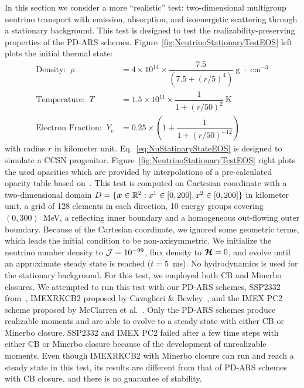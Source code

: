 In this section we consider a more ``realistic'' test: two-dimensional multigroup neutrino transport with emission, absorption, and isoenergetic scattering through a stationary background.  
This test is designed to test the realizability-preserving properties of the PD-ARS schemes.  
Figure~\ref{fig:NeutrinoStationaryTestEOS} left plots the initial thermal state: 
\begin{subequations}
\begin{align}
\text{Density: }~\rho & = 4 \times 10^{14} \times \dfrac{7.5}{( 7.5 + ( r / 5 )^4 )} ~\text{g $\cdot$ cm$^{-3}$}\\
\text{Temperature: }~T & = 1.5 \times 10^{11} \times \dfrac{1}{1 + ( r / 50 )^2 } ~\text{K}\\
\text{Electron Fraction: }~Y_e & = 0.25 \times \left(  1 + \dfrac{1}{1+ ( r / 50 )^{-12}}  \right) 
\end{align}
\label{eq:NuStatinaryStateEOS}
\end{subequations}
with radius $r$ in kilometer unit. 
Eq.~\eqref{eq:NuStatinaryStateEOS} is designed to simulate a CCSN progenitor.
Figure~\ref{fig:NeutrinoStationaryTestEOS} right plots the used opacities which are provided by interpolations of a pre-calculated opacity table based on~\cite{Bruenn_1985}.
This test is computed on Cartesian coordinate with a two-dimensional domain $D=\{\boldsymbol{x}\in\mathbb{R}^{2}:x^{1}\in[0,200], x^{2}\in[0,200]\}$ in kilometer unit, a grid of 128 elements in each direction, 10 energy groups covering $(0,300)$~MeV, a reflecting inner boundary and a homogeneous out-flowing outer boundary.
Because of the Cartesian coordinate, we ignored some geometric terms, which leads the initial condition to be non-axisymmetric.
We initialize the neutrino number density to $\mathcal{J} = 10^{-99}$, flux density to $\boldsymbol{\mathcal{H}}=0$, and evolve until an approximate steady state is reached ($t=5$~ms).
No hydrodynamics is used for the stationary background.
For this test, we employed both CB and Minerbo closures.  
We attempted to run this test with our PD-ARS schemes, SSP2332 from~\cite{pareschiRusso_2005}, IMEXRKCB2 proposed by Cavaglieri \& Bewley~\cite{cavaglieriBewley2015}, and the IMEX PC2 scheme proposed by McClarren et al.~\cite{mcclarren_etal_2008}.
Only the PD-ARS schemes produce realizable moments and are able to evolve to a steady state with either CB or Minerbo closure.
SSP2332 and IMEX PC2 failed after a few time steps with either CB or Minerbo closure because of the development of unrealizable moments.
Even though IMEXRKCB2 with Minerbo closure can run and reach a steady state in this test, its results are different from that of PD-ARS schemes with CB closure, and there is no guarantee of stability.

